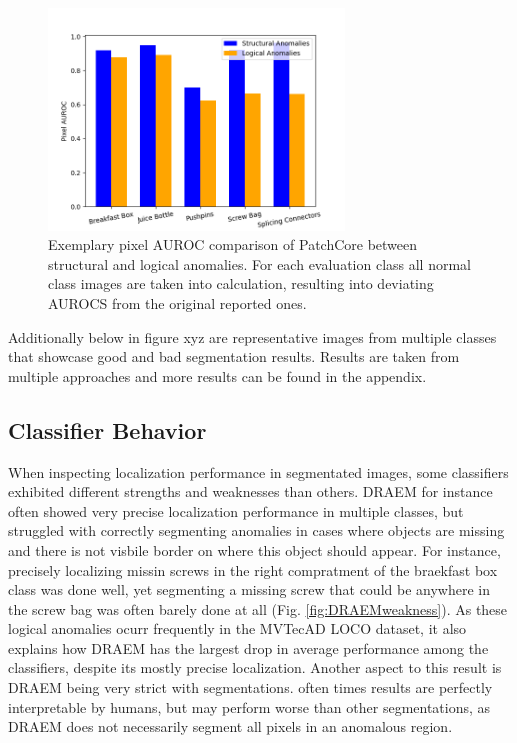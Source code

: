 \begin{figure}[H]
    \centering
    \includegraphics[width=0.7\textwidth]{figures/structvslogic.png}
    \caption{Exemplary pixel AUROC comparison of PatchCore \cite{patchCore2022} between structural and logical anomalies. For each evaluation class all normal class images 
             are taken into calculation, resulting into deviating AUROCS from the original reported ones.}
    \label{fig:structvslogic}
\end{figure}

Additionally below in figure xyz are representative images from multiple classes that showcase good and bad segmentation results. Results are taken from multiple approaches and 
more results can be found in the appendix.





\subsection{Classifier Behavior}
\label{subsec:classifierbehavior}

When inspecting localization performance in segmentated images, some classifiers exhibited different strengths and weaknesses than others. 
DRAEM \cite{Zavrtanik_2021DRAEM} for instance often showed very precise localization performance in multiple classes, but struggled 
with correctly segmenting anomalies in cases where objects are missing and there is not visbile border on where this object should 
appear. For instance, precisely localizing missin screws in the right compratment of the braekfast box class was done well, yet 
segmenting a missing screw that could be anywhere in the screw bag was often barely done at all (Fig. \ref{fig:DRAEMweakness}). As these logical anomalies ocurr 
frequently in the MVTecAD LOCO \cite{LOCODentsAndScratchesBergmann2022} dataset, it also explains how DRAEM 
has the largest drop in average performance among the classifiers, despite its mostly precise localization. Another aspect to this result is DRAEM being very strict with 
segmentations. often times results are perfectly interpretable by humans, but may perform worse than other segmentations, as DRAEM does not necessarily segment all pixels in 
an anomalous region.

